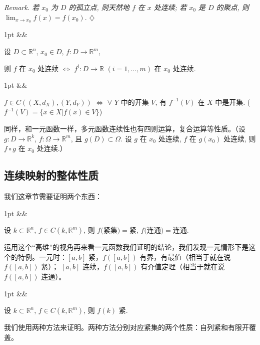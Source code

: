 \documentclass[a4paper]{article}
\newenvironment{formal}[1][]{%
\def\FrameCommand{%
\hspace{1pt}%
{\color{formalline}\vrule width 2pt}%
{\color{formalshade}\vrule width 4pt}%
\colorbox{formalshade}%
}%
\MakeFramed{\advance\hsize-\width\FrameRestore}%
\noindent
\hspace{-4.55pt}%
\begin{adjustwidth}{}{1pt}%
\setlength{\parindent}{0pt}%
\vspace{3pt}%
\ifx&#1&\else %
\textbf{#1}\par
\vspace{1pt}%
\fi }{%
\vspace{2pt}%
\end{adjustwidth}\endMakeFramed%
}
\newenvironment{problem}[1][]{%
\def\FrameCommand{%
\hspace{1pt}%
{\color{problemline}\vrule width 2pt}%
{\color{problemshade}\vrule width 4pt}%
\colorbox{problemshade}%
}%
\MakeFramed{\advance\hsize-\width\FrameRestore}%
\noindent
\hspace{-4.55pt}%
\begin{adjustwidth}{}{1pt}%
\setlength{\parindent}{0pt}%
\vspace{3pt}%
\ifx&#1&\else %
\textbf{#1}\par
\vspace{1pt}%
\fi }{%
\vspace{2pt}%
\end{adjustwidth}\endMakeFramed%
}
\newenvironment{theorem}[1][]{%
\def\FrameCommand{%
\hspace{1pt}%
{\color{theoremline}\vrule width 2pt}%
{\color{theoremshade}\vrule width 4pt}%
\colorbox{theoremshade}%
}%
\MakeFramed{\advance\hsize-\width\FrameRestore}%
\noindent
\hspace{-4.55pt}%
\begin{adjustwidth}{}{1pt}%
\setlength{\parindent}{0pt}%
\vspace{3pt}%
\ifx&#1&\else %
\textbf{#1}\par
\vspace{1pt}%
\fi }{%
\vspace{2pt}%
\end{adjustwidth}\endMakeFramed%
}
\newenvironment{remark}{%
\par
\smallskip
\noindent
\itshape Remark. }{%
\smallskip
\hfill$\diamondsuit$ \par}
\begin{document}
    \begin{remark}
        若 $x_{0}$ 为 $D$ 的孤立点, 则天然地 $f$ 在 $x$ 处连续; 若 $x_{0}$ 是 $D$
        的聚点, 则 $\lim_{x \to x_0}f(x) = f(x_{0}).$
    \end{remark}

    \begin{formal}
        [Prop] 设 $D \subset \mathbb{R}^{n}$, $x_{0}\in D$, $f: D \to \mathbb{R}^{m}$,

        则 $f$ 在 $x_{0}$ 处连续 $\iff$ $f^{i}: D \to \mathbb{R}$ $(i = 1, \dots,
        m)$ 在 $x_{0}$ 处连续.
    \end{formal}

    \begin{problem}
        [思考题] $f \in C((X, d_{X}), (Y, d_{Y}))$ $\iff$ $\forall$ $Y$ 中的开集
        $V$, 有 $f^{-1}(V)$ 在 $X$ 中是开集. ($f^{-1}(V) = \{x \in X | f(x) \in V
        \}$)
    \end{problem}

    同样，和一元函数一样，多元函数连续性也有四则运算，复合运算等性质。（设 $g: D
    \to \mathbb{R}^{k}$, $f: \Omega \to \mathbb{R}^{m}$, 且 $g(D) \subset \Omega$.
    设 $g$ 在 $x_{0}$ 处连续, $f$ 在 $g(x_{0})$ 处连续, 则 $f \circ g$ 在
    $x_{0}$ 处连续.）

    \subsection{连续映射的整体性质}

    我们这章节需要证明两个东西：

    \begin{formal}
        设 $k \subset \mathbb{R}^{n}$, $f \in C(k, \mathbb{R}^{m})$, 则 $f($紧集$)
        =$紧, $f($连通$)=$连通.
    \end{formal}

    运用这个“高维”的视角再来看一元函数我们证明的结论，我们发现一元情形下是这个的特例。一元时：$[
    a,b]$ 紧，$f([a,b])$ 有界，有最值（相当于就在说 $f([a,b])$ 紧）； $[a,b]$
    连续，$f( [a,b])$ 有介值定理（相当于就在说 $f([a,b])$ 连通）。

    \begin{theorem}
        设 $k \subset \mathbb{R}^{n}$, $f \in C(k, \mathbb{R}^{m})$, 则 $f(k)$ 紧.
    \end{theorem}

    我们使用两种方法来证明。两种方法分别对应紧集的两个性质：自列紧和有限开覆盖。
\end{document}
